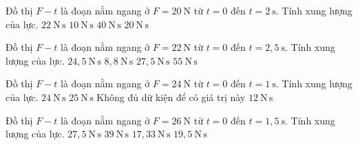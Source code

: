 \begin{ex}
Đồ thị $F-t$ là đoạn nằm ngang ở $F=20\ \mathrm{N}$ từ $t=0$ đến $t=2\ \mathrm{s}$. Tính xung lượng của lực.
\choice
{$22\ \mathrm{N\,s}$}
{$10\ \mathrm{N\,s}$}
{\True $40\ \mathrm{N\,s}$}
{$20\ \mathrm{N\,s}$}
\end{ex}

\begin{ex}
Đồ thị $F-t$ là đoạn nằm ngang ở $F=22\ \mathrm{N}$ từ $t=0$ đến $t=2,5\ \mathrm{s}$. Tính xung lượng của lực.
\choice
{$24,5\ \mathrm{N\,s}$}
{$8,8\ \mathrm{N\,s}$}
{$27,5\ \mathrm{N\,s}$}
{\True $55\ \mathrm{N\,s}$}
\end{ex}

\begin{ex}
Đồ thị $F-t$ là đoạn nằm ngang ở $F=24\ \mathrm{N}$ từ $t=0$ đến $t=1\ \mathrm{s}$. Tính xung lượng của lực.
\choice
{\True $24\ \mathrm{N\,s}$}
{$25\ \mathrm{N\,s}$}
{Không đủ dữ kiện để có giá trị này}
{$12\ \mathrm{N\,s}$}
\end{ex}

\begin{ex}
Đồ thị $F-t$ là đoạn nằm ngang ở $F=26\ \mathrm{N}$ từ $t=0$ đến $t=1,5\ \mathrm{s}$. Tính xung lượng của lực.
\choice
{$27,5\ \mathrm{N\,s}$}
{\True $39\ \mathrm{N\,s}$}
{$17,33\ \mathrm{N\,s}$}
{$19,5\ \mathrm{N\,s}$}
\end{ex}

